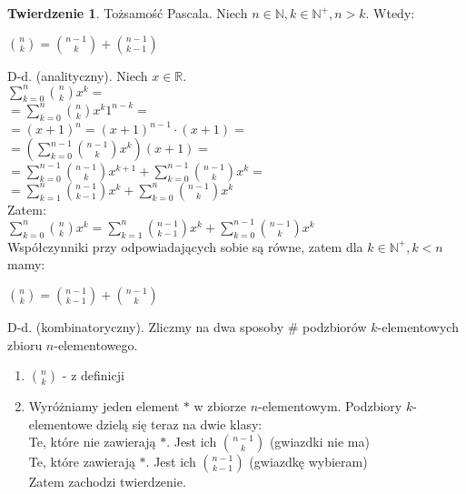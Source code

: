 \documentclass{article}
\theoremstyle{definition}
\theoremstyle{definition}
\newtheorem{tw}{Twierdzenie}[subsection]
\theoremstyle{definition}
\theoremstyle{definition}
\begin{document}
\begin{tw}
  Tożsamość Pascala. Niech $n\in \mathbb{N}, k\in \mathbb{N}^{+}, n>k$. Wtedy:
  \begin{center}
    $\binom{n}{k} = \binom{n-1}{k} + \binom{n-1}{k-1}$
  \end{center}
  D-d. (analityczny). Niech $x\in\mathbb{R}$.\\
  $\sum_{k=0}^{n} \binom{n}{k} x^{k}=$\\
  $=\sum_{k=0}^{n} \binom{n}{k} x^{k} 1^{n-k}=$\\
  $=(x+1)^{n} = (x+1)^{n-1} \cdot (x+1)=$\\
  $=(\sum_{k=0}^{n-1} \binom{n-1}{k} x^k)(x+1)=$\\
  $=\sum_{k=0}^{n-1} \binom{n-1}{k} x^{k+1} + \sum_{k=0}^{n-1} \binom{n-1}{k} x^{k}=$\\
  $=\sum_{k=1}^{n} \binom{n-1}{k-1} x^{k} + \sum_{k=0}^{n} \binom{n-1}{k} x^k$\\
  Zatem:\\
  $\sum_{k=0}^{n} \binom{n}{k} x^k = \sum_{k=1}^{n} \binom{n-1}{k-1} x^k + \sum_{k=0}^{n-1} \binom{n-1}{k} x^k$\\
  Współczynniki przy odpowiadających sobie są równe, zatem dla $k\in\mathbb{N}^{+}, k<n$ mamy:
  
  \begin{center}
    $\binom{n}{k} = \binom{n-1}{k-1} + \binom{n-1}{k}$
  \end{center}
  D-d. (kombinatoryczny). Zliczmy na dwa sposoby \# podzbiorów $k$-elementowych zbioru $n$-elementowego.
  \begin{enumerate}
    \item $\binom{n}{k}$ - z definicji
    \item Wyróżniamy jeden element $*$ w zbiorze $n$-elementowym. Podzbiory $k$-elementowe dzielą się teraz na dwie klasy:\\
      Te, które nie zawierają $*$. Jest ich $\binom{n-1}{k}$ (gwiazdki nie ma)\\
      Te, które zawierają $*$. Jest ich $\binom{n-1}{k-1}$ (gwiazdkę wybieram)\\
      Zatem zachodzi twierdzenie.
  \end{enumerate}
\end{tw}
\end{document}
